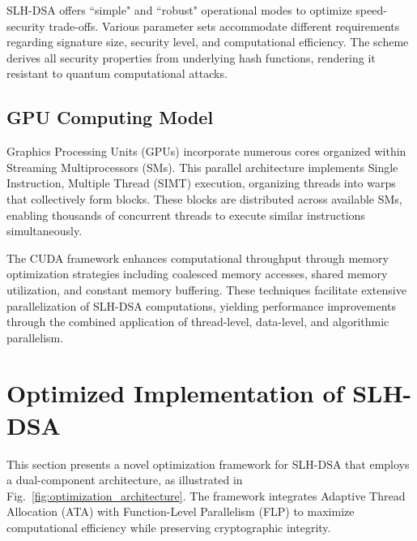 \documentclass[journal]{IEEEtran}
\begin{document}
SLH-DSA offers ``simple" and ``robust" operational modes to optimize speed-security trade-offs. Various parameter sets accommodate different requirements regarding signature size, security level, and computational efficiency. The scheme derives all security properties from underlying hash functions, rendering it resistant to quantum computational attacks.

\subsection{GPU Computing Model}

Graphics Processing Units (GPUs) incorporate numerous cores organized within Streaming Multiprocessors (SMs). This parallel architecture implements Single Instruction, Multiple Thread (SIMT) execution, organizing threads into warps that collectively form blocks. These blocks are distributed across available SMs, enabling thousands of concurrent threads to execute similar instructions simultaneously.

The CUDA framework enhances computational throughput through memory optimization strategies including coalesced memory accesses, shared memory utilization, and constant memory buffering. These techniques facilitate extensive parallelization of SLH-DSA computations, yielding performance improvements through the combined application of thread-level, data-level, and algorithmic parallelism.

\section{Optimized Implementation of SLH-DSA}\label{sec:implementation}

This section presents a novel optimization framework for SLH-DSA that employs a dual-component architecture, as illustrated in Fig.~\ref{fig:optimization_architecture}. The framework integrates Adaptive Thread Allocation (ATA) with Function-Level Parallelism (FLP) to maximize computational efficiency while preserving cryptographic integrity.
\end{document}
